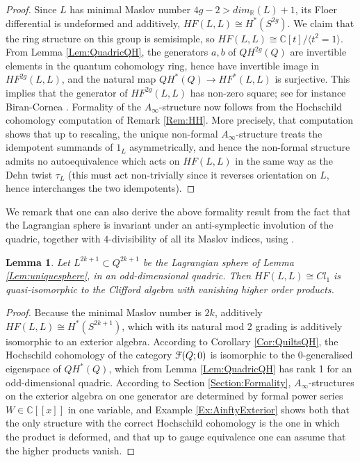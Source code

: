 \documentclass[reqno,10pt]{amsart}
\numberwithin{equation}{section}
\newcommand{\bC}{{\mathbb C}}
\newcommand{\bR}{{\mathbb R}}
\newcommand{\scrF}{\EuScript{F}}
\newtheorem{Lemma}[thm]{Lemma}
\theoremstyle{remark}
\begin{document}
\begin{proof}
Since $L$ has minimal Maslov number $4g-2 > dim_{\bR}(L)+1$, its Floer differential is undeformed and additively, $HF(L,L) \cong H^*(S^{2g})$.  We claim that  the ring structure on this group is semisimple, so $HF(L,L) \cong \bC[t] / \langle t^2=1\rangle$. From Lemma \ref{Lem:QuadricQH}, the generators $a,b$ of $QH^{2g}(Q)$  are invertible elements in the quantum cohomology ring, hence have invertible image in $HF^{2g}(L,L)$, and the natural map $QH^*(Q) \rightarrow HF^*(L,L)$ is surjective. This implies that  the generator of $HF^{2g}(L,L)$ has non-zero square; see for instance Biran-Cornea \cite[Proposition 6.33]{BiranCornea}. Formality of the $A_{\infty}$-structure now follows from the Hochschild cohomology computation of Remark \ref{Rem:HH}.  More precisely, that computation shows that up to rescaling, the unique non-formal $A_{\infty}$-structure treats the idempotent summands of $1_L$ asymmetrically, and hence the non-formal structure admits no autoequivalence which acts on $HF(L,L)$ in the same way as the Dehn twist $\tau_L$ (this must act non-trivially since it reverses orientation on $L$, hence interchanges the two idempotents).
\end{proof}

We remark that one can also derive the above formality result from the fact that the Lagrangian sphere is invariant under an anti-symplectic involution of the quadric, together with $4$-divisibility of all its Maslov indices, using \cite[Chapter 8]{FO3}. 

\begin{Lemma} \label{Lem:Ainfinitytrivial2}
Let $L^{2k+1}\subset Q^{2k+1}$ be the Lagrangian sphere of Lemma \ref{Lem:uniquesphere}, in an odd-dimensional quadric.  Then $HF(L,L) \cong Cl_1$ is quasi-isomorphic to the Clifford algebra with vanishing higher order products.\end{Lemma}

\begin{proof}
Because the minimal Maslov number is $2k$, additively $HF(L,L) \cong H^*(S^{2k+1})$, which with its natural mod 2 grading is additively isomorphic to an exterior algebra.  According to Corollary \ref{Cor:QuiltsQH}, the Hochschild cohomology of the category $\scrF(Q;0)$ is isomorphic to the $0$-generalised eigenspace of $QH^*(Q)$, which from Lemma \ref{Lem:QuadricQH} has rank 1 for an odd-dimensional quadric. 
According to Section \ref{Section:Formality}, $A_{\infty}$-structures on the exterior algebra on one generator are determined by formal power series $W \in \bC[[x]]$ in one variable, and Example \ref{Ex:AinftyExterior} shows both that the only structure with the correct Hochschild cohomology is the one in which the product is deformed, and that up to gauge equivalence one can assume that the higher products vanish.
\end{proof}
\end{document}
